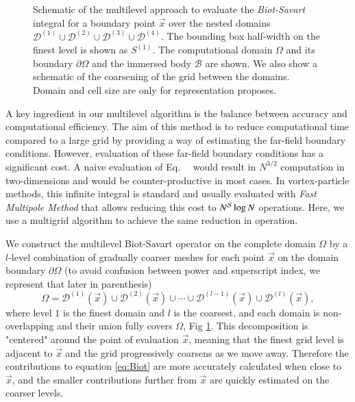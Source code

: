 \documentclass[preprint,12pt]{elsarticle}
\begin{document}
\begin{figure}
    \centering
    \def\svgwidth{0.8\columnwidth}
    
    \caption{Schematic of the multilevel approach to evaluate the \emph{Biot-Savart} integral for a boundary point $\vec x$ over the nested domains $\mathcal{D}^{(1)} \cup \mathcal{D}^{(2)} \cup \mathcal{D}^{(3)} \cup \mathcal{D}^{(4)}$. The bounding box half-width on the finest level is shown as ${S}^{(1)}$. The computational domain $\Omega$ and its boundary $\partial\Omega$ and the immersed body $\mathcal{B}$ are shown. We also show a schematic of the coarsening of the grid between the domains. Domain and cell size are only for representation proposes.}
    \label{Fig_2}
\end{figure}

A key ingredient in our multilevel algorithm is the balance between accuracy and computational efficiency. The aim of this method is to reduce computational time compared to a large grid by providing a way of estimating the far-field boundary conditions. However, evaluation of these far-field boundary conditions has a significant cost. A naive evaluation of Eq.~\theequation~ would result in $N^{3/2}$ computation in two-dimensions and would be counter-productive in most cases. In vortex-particle methods, this infinite integral is standard and usually evaluated with \emph{Fast Multipole Method} that allows reducing this cost to $N^{\cal S}\log N$ operations. Here, we use a multigrid algorithm to achieve the same reduction in operation.


We construct the multilevel Biot-Savart operator on the complete domain $\Omega$ by a $l$-level combination of gradually coarser meshes for each point $\vec x$ on the domain boundary $\partial \Omega$ (to avoid confusion between power and superscript index, we represent that later in parenthesis)
\begin{equation}\label{eq:multilevel}
    \Omega = \mathcal{D}^{(1)}(\vec x) \cup \mathcal{D}^{(2)}(\vec x) \cup \cdots \cup \mathcal{D}^{(l-1)}(\vec x) \cup \mathcal{D}^{(l)}(\vec x),
\end{equation}
where level $1$ is the finest domain and $l$ is the coarsest, and each domain is non-overlapping and their union fully covers $\Omega$, Fig \ref{Fig_2}. This decomposition is "centered" around the point of evaluation $\vec x$, meaning that the finest grid level is adjacent to $\vec x$ and the grid progressively coarsens as we move away. Therefore the contributions to equation \ref{eq:Biot} are more accurately calculated when close to $\vec x$, and the smaller contributions further from $\vec x$ are quickly estimated on the coarser levels.
\end{document}

